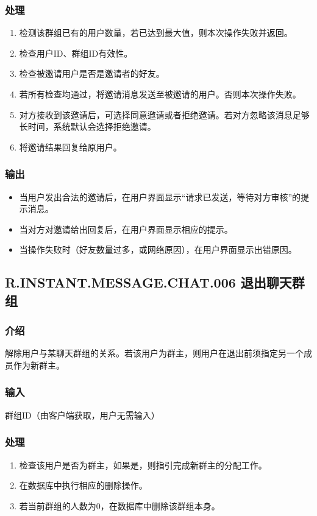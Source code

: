 \subsubsection{处理}
\begin{enumerate}
	\item 检测该群组已有的用户数量，若已达到最大值，则本次操作失败并返回。
	\item 检查用户ID、群组ID有效性。
	\item 检查被邀请用户是否是邀请者的好友。
	\item 若所有检查均通过，将邀请消息发送至被邀请的用户。否则本次操作失败。
	\item 对方接收到该邀请后，可选择同意邀请或者拒绝邀请。若对方忽略该消息足够长时间，系统默认会选择拒绝邀请。
	\item 将邀请结果回复给原用户。
\end{enumerate}
\subsubsection{输出}
\begin{itemize}
	\item 当用户发出合法的邀请后，在用户界面显示“请求已发送，等待对方审核”的提示消息。
	\item 当对方对邀请给出回复后，在用户界面显示相应的提示。
	\item 当操作失败时（好友数量过多，或网络原因），在用户界面显示出错原因。
\end{itemize}

\subsection{R.INSTANT.MESSAGE.CHAT.006 退出聊天群组}
\subsubsection{介绍}
解除用户与某聊天群组的关系。若该用户为群主，则用户在退出前须指定另一个成员作为新群主。
\subsubsection{输入}
群组ID（由客户端获取，用户无需输入）
\subsubsection{处理}
\begin{enumerate}
	\item 检查该用户是否为群主，如果是，则指引完成新群主的分配工作。
	\item 在数据库中执行相应的删除操作。
	\item 若当前群组的人数为0，在数据库中删除该群组本身。
\end{enumerate}
